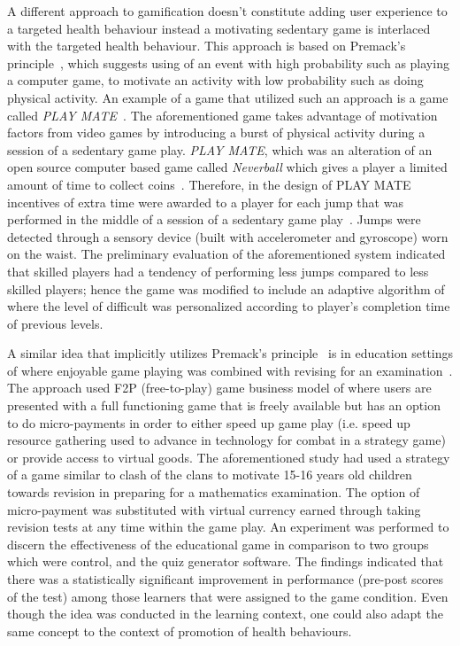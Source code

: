 A different approach to gamification doesn't constitute adding user experience to a targeted health behaviour instead a motivating sedentary game is interlaced with the targeted health behaviour. This approach is based on Premack's principle~\citep{premack1959toward}, which suggests using of an event with high probability such as playing a computer game, to motivate an activity with low probability such as doing physical activity. An example of a game that utilized such an approach is a game called \emph{PLAY MATE}~\citep{berkovsky2010physical,berkovsky2012physical}. The aforementioned game takes advantage of motivation factors from video games by introducing a burst of physical activity during a session of a sedentary game play. \emph{PLAY MATE}, which was an alteration of an open source computer based game called \emph{Neverball} which gives a player a limited amount of time to collect coins~\citep{berkovsky2012physical}. Therefore, in the design of PLAY MATE incentives of extra time were awarded to a player for each jump that was performed in the middle of a session of a sedentary game play~\citep{berkovsky2012physical}. Jumps were detected through a sensory device (built with accelerometer and gyroscope) worn on the waist. The preliminary evaluation of the aforementioned system indicated that skilled players had a tendency of performing less jumps compared to less skilled players; hence the game was modified to include an adaptive algorithm of where the level of difficult was personalized according to player's completion time of previous levels.

A similar idea that implicitly utilizes Premack's principle~\citep{premack1959toward} is in education settings of where enjoyable  game  playing was combined with revising for an examination~\citep{preist2015use}. The approach used F2P (free-to-play) game business model of where users are presented with a full functioning game that is freely available but has an option to do micro-payments in order to either speed up game play (i.e. speed up resource gathering used to advance in technology for combat in a strategy game) or provide access to virtual goods. The aforementioned study had used a strategy of a game similar to clash of the clans to motivate 15-16 years old children towards revision in preparing for a mathematics examination. The option of micro-payment was substituted with virtual currency earned through taking revision tests at any time within the game play. An experiment was performed to discern the effectiveness of the educational game in comparison to two groups which were control, and the quiz generator software. The findings indicated that there was a statistically significant improvement in performance (pre-post scores of the test) among those learners that were assigned to the game condition. Even though the idea was conducted in the learning context, one could also adapt the same concept to the context of promotion of health behaviours.


